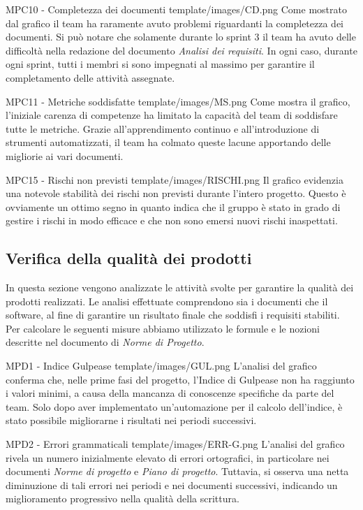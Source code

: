 \Met
{ %
    MPC10 - Completezza dei documenti
}
{ %
    template/images/CD.png
}
{ %
    Come mostrato dal grafico il team ha raramente avuto problemi riguardanti la completezza dei documenti.
    Si può notare che solamente durante lo sprint 3 il team ha avuto delle difficoltà nella redazione del documento \textit{Analisi dei requisiti}.
    In ogni caso, durante ogni sprint, tutti i membri si sono impegnati al massimo per garantire il completamento delle attività assegnate.
}

\Met
{ %
    MPC11 - Metriche soddisfatte
}
{ %
    template/images/MS.png
}
{ %
    Come mostra il grafico, l'iniziale carenza di competenze ha limitato la capacità del team di soddisfare tutte le metriche.
    Grazie all'apprendimento continuo e all'introduzione di strumenti automatizzati, il team ha colmato queste lacune apportando delle migliorie ai vari documenti.
}

\Met
{ %
    MPC15 - Rischi non previsti
}
{ %
    template/images/RISCHI.png
}
{ %
    Il grafico evidenzia una notevole stabilità dei rischi non previsti durante l'intero progetto.
    Questo è ovviamente un ottimo segno in quanto indica che il gruppo è stato in grado di gestire i rischi in modo efficace e che non sono 
    emersi nuovi rischi inaspettati.
}

\subsection{Verifica della qualità dei prodotti}
In questa sezione vengono analizzate le attività svolte per garantire la qualità dei prodotti realizzati.
 Le analisi effettuate comprendono sia i documenti che il software, al fine di garantire un risultato finale che soddisfi i requisiti stabiliti.\\
Per calcolare le seguenti misure abbiamo utilizzato le formule e le nozioni descritte nel documento di \textit{Norme di Progetto}.

\Met
{ %
    MPD1 - Indice Gulpease
}
{ %
    template/images/GUL.png
}
{ %
    L'analisi del grafico conferma che, nelle prime fasi del progetto, l'Indice di Gulpease non ha raggiunto i valori minimi, a causa della mancanza di conoscenze specifiche da parte del team.
    Solo dopo aver implementato un'automazione per il calcolo dell'indice, è stato possibile migliorarne i risultati nei periodi successivi.
}

\Met
{ %
    MPD2 - Errori grammaticali
}
{ %
    template/images/ERR-G.png
}
{ %
    L'analisi del grafico rivela un numero inizialmente elevato di errori ortografici, in particolare nei documenti \textit{Norme di progetto} e \textit{Piano di progetto}.
    Tuttavia, si osserva una netta diminuzione di tali errori nei periodi e nei documenti successivi, indicando un miglioramento progressivo nella qualità della scrittura.
}



